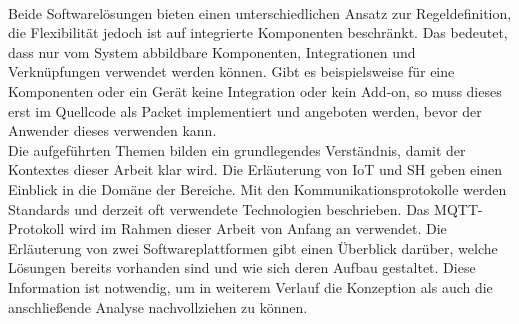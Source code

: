     \\
    Beide Softwarelösungen bieten einen unterschiedlichen Ansatz zur Regeldefinition, die Flexibilität 
    jedoch ist auf integrierte Komponenten beschränkt. Das bedeutet, dass nur vom System abbildbare Komponenten, 
    Integrationen und Verknüpfungen verwendet werden können. Gibt es beispielsweise für eine Komponenten oder ein Gerät keine 
    Integration oder kein Add-on, so muss dieses erst im Quellcode als Packet implementiert und angeboten werden, bevor der 
    Anwender dieses verwenden kann. 
    \\
    \linebreak
    Die aufgeführten Themen bilden ein grundlegendes Verständnis, damit der Kontextes dieser Arbeit klar wird. Die Erläuterung von 
    \acs{IoT} und \acl{SH} geben einen Einblick in die Domäne der Bereiche. Mit den Kommunikationsprotokolle werden Standards 
    und derzeit oft verwendete Technologien beschrieben. Das \acs{MQTT}-Protokoll wird im Rahmen dieser Arbeit von Anfang an verwendet. 
    Die Erläuterung von zwei Softwareplattformen gibt einen Überblick 
    darüber, welche Lösungen bereits vorhanden sind und wie sich deren Aufbau gestaltet. Diese Information ist notwendig, um in 
    weiterem Verlauf die Konzeption als auch die anschließende Analyse nachvollziehen zu können.

 